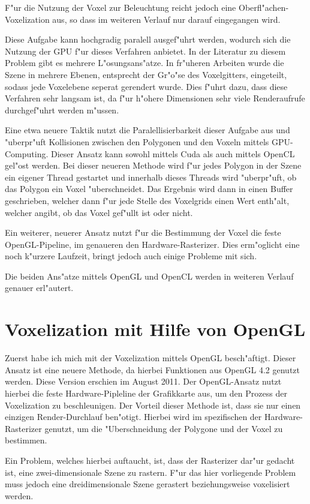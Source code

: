 \documentclass[a4paper, 12pt]{scrartcl}
\begin{document}
F"ur die Nutzung der Voxel zur Beleuchtung reicht jedoch eine Oberfl"achen-Voxelization aus, so dass im weiteren Verlauf nur darauf eingegangen wird.

Diese Aufgabe kann hochgradig paralell ausgef"uhrt werden, wodurch sich die Nutzung der GPU f"ur dieses Verfahren anbietet. In der Literatur zu diesem Problem gibt es mehrere L"osungsans"atze. 
In fr"uheren Arbeiten wurde die Szene in mehrere Ebenen, entsprecht der Gr"o"se des Voxelgitters, eingeteilt, sodass jede Voxelebene seperat gerendert wurde. Dies f"uhrt dazu, dass diese Verfahren sehr langsam ist, da f"ur h"ohere Dimensionen sehr viele Renderaufrufe durchgef"uhrt werden m"ussen.

Eine etwa neuere Taktik nutzt die Paralellisierbarkeit dieser Aufgabe aus und "uberpr"uft Kollisionen zwischen den Polygonen und den Voxeln mittels GPU-Computing. Dieser Ansatz kann sowohl mittels Cuda als auch mittels OpenCL gel"ost werden.
Bei dieser neueren Methode wird f"ur jedes Polygon in der Szene ein eigener Thread gestartet und innerhalb dieses Threads wird "uberpr"uft, ob das Polygon ein Voxel "uberschneidet. Das Ergebnis wird dann in einen Buffer geschrieben, welcher dann f"ur jede Stelle des Voxelgrids einen Wert enth"alt, welcher angibt, ob das Voxel gef"ullt ist oder nicht.

Ein weiterer, neuerer Ansatz nutzt f"ur die Bestimmung der Voxel die feste OpenGL-Pipeline, im genaueren den Hardware-Rasterizer. Dies erm"oglicht eine noch k"urzere Laufzeit, bringt jedoch auch einige Probleme mit sich.

Die beiden Ans"atze mittels OpenGL und OpenCL werden in weiteren Verlauf genauer erl"autert.



\section{Voxelization mit Hilfe von OpenGL}
Zuerst habe ich mich mit der Voxelization mittels OpenGL besch"aftigt. Dieser Ansatz ist eine neuere Methode, da hierbei Funktionen aus OpenGL 4.2 genutzt werden. Diese Version erschien im August 2011. 
Der OpenGL-Ansatz nutzt hierbei die feste Hardware-Pipleline der Grafikkarte aus, um den Prozess der Voxelization zu beschleunigen. 
Der Vorteil dieser Methode ist, dass sie nur einen einzigen Render-Durchlauf ben"otigt.
Hierbei wird im spezifischen der Hardware-Rasterizer genutzt, um die "Uberschneidung der Polygone und der Voxel zu bestimmen. 

Ein Problem, welches hierbei auftaucht, ist, dass der Rasterizer dar"ur gedacht ist, eine zwei-dimensionale Szene zu rastern. F"ur das hier vorliegende Problem muss jedoch eine dreidimensionale Szene gerastert beziehungsweise voxelisiert werden.
\end{document}
